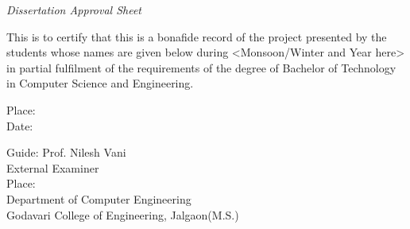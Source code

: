 \newpage
\thispagestyle{empty}

\begin{center}
\emph{\LARGE Dissertation Approval Sheet}\\[2.5cm]
\end{center}

\normalsize This is to certify that this is a bonafide record of the project presented by the students whose names are given below during <Monsoon/Winter and Year here> in partial fulfilment of the requirements of the degree of Bachelor of Technology in Computer Science and Engineering.\\[1.0cm]

\begin{flushleft}
Place:\\
Date:
\end{flushleft}







\begin{flushleft}
Guide: Prof. Nilesh Vani\\[2cm]
External Examiner\\[1.5cm]
Place:\\
Department of Computer Engineering\\
Godavari College of Engineering, Jalgaon(M.S.) 
\end{flushleft}

